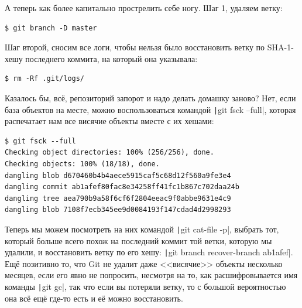 \documentclass{../../text-style}
\begin{document}
А теперь как более капитально прострелить себе ногу. Шаг 1, удаляем ветку:

\begin{verbatim}
$ git branch -D master
\end{verbatim}

Шаг второй, сносим все логи, чтобы нельзя было восстановить ветку по SHA-1-хешу последнего коммита, на который она указывала:

\begin{verbatim}
$ rm -Rf .git/logs/
\end{verbatim}

Казалось бы, всё, репозиторий запорот и надо делать домашку заново? Нет, если база объектов на месте, можно воспользоваться командой \texttt|git fsck --full|, которая распечатает нам все висячие объекты вместе с их хешами:

\begin{verbatim}
$ git fsck --full
Checking object directories: 100% (256/256), done.
Checking objects: 100% (18/18), done.
dangling blob d670460b4b4aece5915caf5c68d12f560a9fe3e4
dangling commit ab1afef80fac8e34258ff41fc1b867c702daa24b
dangling tree aea790b9a58f6cf6f2804eeac9f0abbe9631e4c9
dangling blob 7108f7ecb345ee9d0084193f147cdad4d2998293
\end{verbatim}

Теперь мы можем посмотреть на них командой \texttt|git cat-file -p|, выбрать тот, который больше всего похож на последний коммит той ветки, которую мы удалили, и восстановить ветку по его хешу: \texttt|git branch recover-branch ab1afef|. Ещё позитивно то, что Git не удалит даже <<висячие>> объекты несколько месяцев, если его явно не попросить, несмотря на то, как расшифровывается имя команды \texttt|git gc|, так что если вы потеряли ветку, то с большой вероятностью она всё ещё где-то есть и её можно восстановить.
\end{document}
